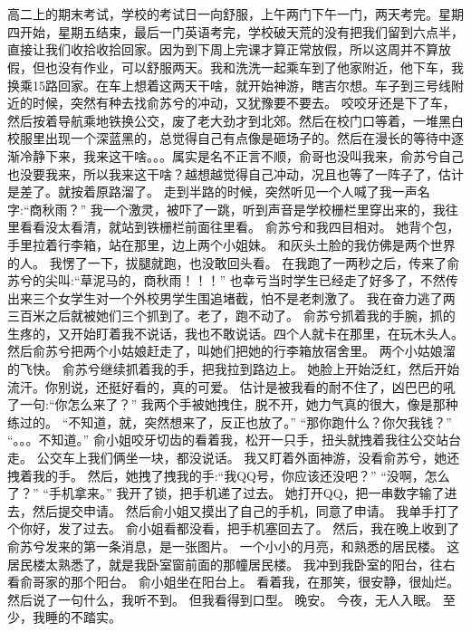 \chapter{}
高二上的期末考试，学校的考试日一向舒服，上午两门下午一门，两天考完。星期四开始，星期五结束，最后一门英语考完，学校破天荒的没有把我们留到六点半，直接让我们收拾收拾回家。因为到下周上完课才算正常放假，所以这周并不算放假，但也没有作业，可以舒服两天。我和洗洗一起乘车到了他家附近，他下车，我换乘15路回家。在车上想着这两天干啥，就开始神游，瞎吉尔想。车子到三号线附近的时候，突然有种去找俞苏兮的冲动，又犹豫要不要去。
咬咬牙还是下了车，然后按着导航乘地铁换公交，废了老大劲才到北郊。然后在校门口等着，一堆黑白校服里出现一个深蓝黑的，总觉得自己有点像是砸场子的。然后在漫长的等待中逐渐冷静下来，我来这干啥。。。属实是名不正言不顺，俞哥也没叫我来，俞苏兮自己也没要我来，所以我来这干啥？越想越觉得自己冲动，况且也等了一阵子了，估计是差了。就按着原路溜了。
走到半路的时候，突然听见一个人喊了我一声名字:“商秋雨？”
我一个激灵，被吓了一跳，听到声音是学校栅栏里穿出来的，我往里看看没太看清，就站到铁栅栏前面往里看。
俞苏兮和我四目相对。 她背个包，手里拉着行李箱，站在那里，边上两个小姐妹。
和灰头土脸的我仿佛是两个世界的人。
我愣了一下，拔腿就跑，也没敢回头看。
在我跑了一两秒之后，传来了俞苏兮的尖叫:“草泥马的，商秋雨！！！”
也幸亏当时学生已经走了好多了，不然传出来三个女学生对一个外校男学生围追堵截，怕不是老刺激了。
我在奋力逃了两三百米之后就被她们三个抓到了。老了，跑不动了。
俞苏兮抓着我的手腕，抓的生疼的，又开始盯着我不说话，我也不敢说话。四个人就卡在那里，在玩木头人。
然后俞苏兮把两个小姑娘赶走了，叫她们把她的行李箱放宿舍里。
两个小姑娘溜的飞快。
俞苏兮继续抓着我的手，把我拉到路边上。
她脸上开始泛红，然后开始流汗。你别说，还挺好看的，真的可爱。
估计是被我看的耐不住了，凶巴巴的吼了一句:“你怎么来了？”
我两个手被她拽住，脱不开，她力气真的很大，像是那种练过的。
“不知道，就，突然想来了，反正也放了。”
“那你跑什么？你欠我钱？”
“。。。不知道。”
俞小姐咬牙切齿的看着我，松开一只手，扭头就拽着我往公交站台走。
公交车上我们俩坐一块，都没说话。
我又盯着外面神游，没看俞苏兮，她还拽着我的手。
然后，她拽了拽我的手:“我QQ号，你应该还没吧？”
“没啊，怎么了？” “手机拿来。”
我开了锁，把手机递了过去。 她打开QQ，把一串数字输了进去，然后提交申请。
然后俞小姐又摸出了自己的手机，同意了申请。
我单手打了个你好，发了过去。
俞小姐看都没看，把手机塞回去了。
然后，我在晚上收到了俞苏兮发来的第一条消息，是一张图片。 一个小小的月亮，和熟悉的居民楼。
这居民楼太熟悉了，就是我卧室窗前面的那幢居民楼。
我冲到我卧室的阳台，往右看俞哥家的那个阳台。
俞小姐坐在阳台上。
看着我，在那笑，很安静，很灿烂。
然后说了一句什么，我听不到。
但我看得到口型。
晚安。
今夜，无人入眠。
至少，我睡的不踏实。

